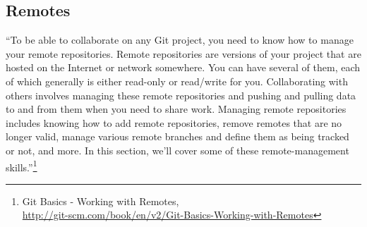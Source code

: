 
\newpage
\subsection{Remotes}
``To be able to collaborate on any Git project, you need to know
how to manage your remote repositories.  Remote repositories are
versions of your project that are hosted on the Internet or
network somewhere.  You can have several of them, each of which
generally is either read-only or read/write for you.
Collaborating with others involves managing these remote
repositories and pushing and pulling data to and from them when
you need to share work.  Managing remote repositories includes
knowing how to add remote repositories, remove remotes that are no
longer valid, manage various remote branches and define them as
being tracked or not, and more. In this section, we'll cover some
of these remote-management skills.''\footnote{Git Basics - Working
with Remotes,\\
\href{http://git-scm.com/book/en/v2/Git-Basics-Working-with-Remotes}{http://git-scm.com/book/en/v2/Git-Basics-Working-with-Remotes}}



